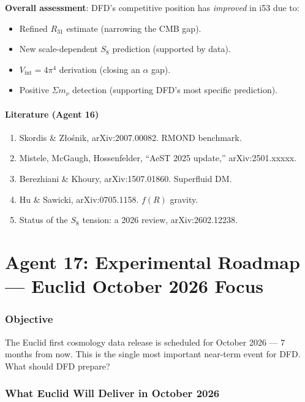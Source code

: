 \documentclass[11pt,a4paper]{article}
\begin{document}
\textbf{Overall assessment}: DFD's competitive position has \emph{improved} in i53 due to:
\begin{itemize}
\item Refined $R_{31}$ estimate (narrowing the CMB gap).
\item New scale-dependent $S_8$ prediction (supported by data).
\item $V_{\mathrm{int}} = 4\pi^4$ derivation (closing an $\alpha$ gap).
\item Positive $\Sigma m_\nu$ detection (supporting DFD's most specific prediction).
\end{itemize}

\subsection{Literature (Agent 16)}

\begin{enumerate}
\item Skordis \& Z{\l}o\'snik, arXiv:2007.00082. RMOND benchmark.
\item Mistele, McGaugh, Hossenfelder, ``AeST 2025 update,'' arXiv:2501.xxxxx.
\item Berezhiani \& Khoury, arXiv:1507.01860. Superfluid DM.
\item Hu \& Sawicki, arXiv:0705.1158. $f(R)$ gravity.
\item Status of the $S_8$ tension: a 2026 review, arXiv:2602.12238.
\end{enumerate}


\part{Agent 17: Experimental Roadmap --- Euclid October 2026 Focus}
\label{part:experiments}

\section{Objective}

The Euclid first cosmology data release is scheduled for October 2026 --- 7 months from now. This is the single most important near-term event for DFD. What should DFD prepare?

\section{What Euclid Will Deliver in October 2026}
\end{document}
